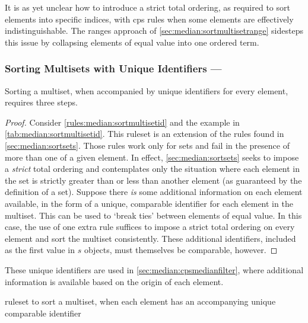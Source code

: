 It is as yet unclear how to introduce a strict total ordering, as required to sort elements into specific indices, with \gls{cps} rules when some elements are effectively indistinguishable.  The ranges approach of \cref{sec:median:sortmultisetrange} sidesteps this issue by collapsing elements of equal value into one ordered term.

\subsubsection{Sorting Multisets with Unique Identifiers --- }\label{sec:median:sortmultisetid}

\begin{proposition}\label{prop:median:sortmultisetid}
Sorting a multiset, when accompanied by unique identifiers for every element, requires three steps.
\end{proposition}

\begin{proof}
Consider \cref{rules:median:sortmultisetid} and the example in \cref{tab:median:sortmultisetid}.  This \gls{ruleset} is an extension of the rules found in \cref{sec:median:sortsets}.  Those rules work only for sets and fail in the presence of more than one of a given element.  In effect, \cref{sec:median:sortsets} seeks to impose a \emph{strict} total ordering and contemplates only the situation where each element in the set is strictly greater than or less than another element (as guaranteed by the definition of a set).  Suppose there \emph{is} some additional information on each element available, in the form of a unique, comparable identifier for each element in the multiset. This can be used to `break ties' between elements of equal value.  In this case, the use of one extra rule suffices to impose a strict total ordering on every element and sort the multiset consistently.  These additional identifiers, included as the first value in \(s\) objects, must themselves be comparable, however.
\end{proof}

These unique identifiers are used in \cref{sec:median:cpsmedianfilter}, where additional information is available based on the origin of each element.

\begin{cprulesetfloat}
\begin{cpruleset}


\end{cpruleset}
\caption{\label{rules:median:sortmultisetid}\Gls{ruleset} to sort a multiset, when each element has an accompanying unique comparable identifier}
\end{cprulesetfloat}

